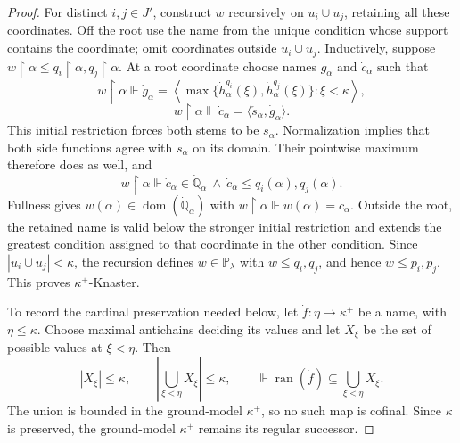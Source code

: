 \documentclass[10pt,a4paper]{amsart}
\theoremstyle{definition}
\theoremstyle{remark}
\newcommand{\PP}{\mathbb P}
\DeclareMathOperator{\dom}{dom}
\begin{document}
\begin{proof}
For distinct \(i,j\in J'\), construct \(w\) recursively
on \(u_i\cup u_j\), retaining all these coordinates.
Off the root use the name from the unique condition whose
support contains the coordinate; omit coordinates outside
\(u_i\cup u_j\). Inductively, suppose
\(w\restriction\alpha\leq
q_i\restriction\alpha,q_j\restriction\alpha\).
At a root coordinate choose names \(\dot g_\alpha\) and
\(\dot c_\alpha\) such that
\[
 w\restriction\alpha\Vdash
 \dot g_\alpha=\left\langle
       \max\{\dot h_\alpha^{q_i}(\xi),\dot h_\alpha^{q_j}(\xi)\}:
                                      \xi<\kappa\right\rangle,
\]
\[
 w\restriction\alpha\Vdash
 \dot c_\alpha=\langle\check s_\alpha,\dot g_\alpha\rangle.
\]
This initial restriction forces both stems to be \(s_\alpha\).
Normalization implies that both side functions agree with
\(s_\alpha\) on its domain. Their pointwise maximum therefore
does as well, and
\[
 w\restriction\alpha\Vdash
 \dot c_\alpha\in\dot{\mathbb Q}_\alpha
              \ \land\ \dot c_\alpha\leq q_i(\alpha),q_j(\alpha).
\]
Fullness gives \(w(\alpha)\in\dom(\dot{\mathbb Q}_\alpha)\)
with \(w\restriction\alpha\Vdash
w(\alpha)=\dot c_\alpha\). Outside the root, the retained name
is valid below the stronger initial restriction and extends the
greatest condition assigned to that coordinate in the other
condition. Since
\(|u_i\cup u_j|<\kappa\), the recursion defines
\(w\in\PP_\lambda\) with \(w\leq q_i,q_j\),
and hence \(w\leq p_i,p_j\). This proves
\(\kappa^+\)-Knaster.

To record the cardinal preservation needed below, let
\(\dot f:\eta\to\kappa^+\) be a name, with \(\eta\leq\kappa\).
Choose maximal antichains deciding its values and let
\(X_\xi\) be the set of possible values at \(\xi<\eta\).
Then
\[
 |X_\xi|\leq\kappa,\qquad
 \left|\bigcup_{\xi<\eta}X_\xi\right|\leq\kappa,
 \qquad
 \Vdash\operatorname{ran}(\dot f)
                           \subseteq\bigcup_{\xi<\eta}X_\xi.
\]
The union is bounded in the ground-model \(\kappa^+\), so
no such map is cofinal. Since \(\kappa\) is preserved, the
ground-model \(\kappa^+\) remains its regular successor.
\end{proof}
\end{document}
